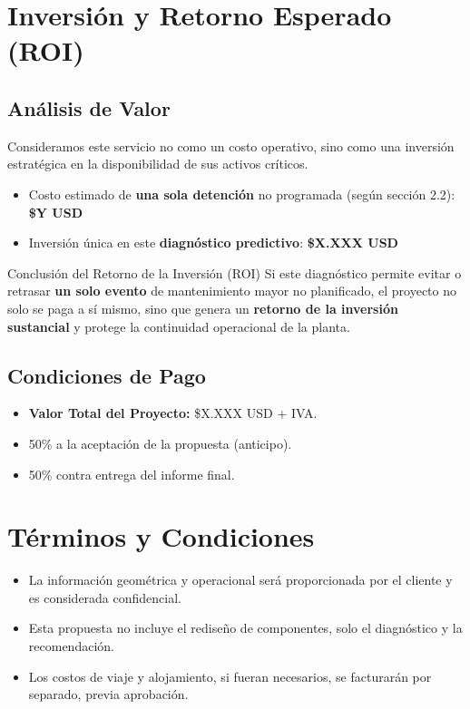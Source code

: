 \documentclass[11pt, a4paper]{article}
\begin{document}
\section{Inversión y Retorno Esperado (ROI)}
\subsection{Análisis de Valor}
Consideramos este servicio no como un costo operativo, sino como una inversión estratégica en la disponibilidad de sus activos críticos.
\begin{itemize}
    \item Costo estimado de \textbf{una sola detención} no programada (según sección 2.2): \textbf{\$Y USD}
    \item Inversión única en este \textbf{diagnóstico predictivo}: \textbf{\$X.XXX USD}
\end{itemize}

\begin{infobox}{Conclusión del Retorno de la Inversión (ROI)}
    Si este diagnóstico permite evitar o retrasar \textbf{un solo evento} de mantenimiento mayor no planificado, el proyecto no solo se paga a sí mismo, sino que genera un \textbf{retorno de la inversión sustancial} y protege la continuidad operacional de la planta.
\end{infobox}

\subsection{Condiciones de Pago}
\begin{itemize}
    \item \textbf{Valor Total del Proyecto:} \$X.XXX USD + IVA.
    \item 50\% a la aceptación de la propuesta (anticipo).
    \item 50\% contra entrega del informe final.
\end{itemize}

\section{Términos y Condiciones}
\begin{itemize}
    \item La información geométrica y operacional será proporcionada por el cliente y es considerada confidencial.
    \item Esta propuesta no incluye el rediseño de componentes, solo el diagnóstico y la recomendación.
    \item Los costos de viaje y alojamiento, si fueran necesarios, se facturarán por separado, previa aprobación.
\end{itemize}
\end{document}
